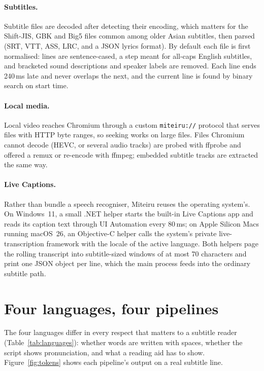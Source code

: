 ﻿\documentclass[11pt,a4paper]{article}
\begin{document}
\paragraph{Subtitles.}
Subtitle files are decoded after detecting their encoding, which matters for the Shift-JIS, GBK and Big5 files common among older Asian subtitles, then parsed (SRT, VTT, ASS, LRC, and a JSON lyrics format). By default each file is first normalised: lines are sentence-cased, a step meant for all-caps English subtitles, and bracketed sound descriptions and speaker labels are removed. Each line ends 240\,ms late and never overlaps the next, and the current line is found by binary search on start time.

\paragraph{Local media.}
Local video reaches Chromium through a custom \texttt{miteiru://} protocol that serves files with HTTP byte ranges, so seeking works on large files. Files Chromium cannot decode (HEVC, or several audio tracks) are probed with ffprobe and offered a remux or re-encode with ffmpeg; embedded subtitle tracks are extracted the same way.

\paragraph{Live Captions.}
Rather than bundle a speech recogniser, Miteiru reuses the operating system's. On Windows~11, a small .NET helper starts the built-in Live Captions app and reads its caption text through UI Automation every 80\,ms; on Apple Silicon Macs running macOS~26, an Objective-C helper calls the system's private live-transcription framework with the locale of the active language. Both helpers page the rolling transcript into subtitle-sized windows of at most 70 characters and print one JSON object per line, which the main process feeds into the ordinary subtitle path.

\section{Four languages, four pipelines}
\label{sec:languages}

The four languages differ in every respect that matters to a subtitle reader (Table~\ref{tab:languages}): whether words are written with spaces, whether the script shows pronunciation, and what a reading aid has to show. Figure~\ref{fig:tokens} shows each pipeline's output on a real subtitle line.
\end{document}
